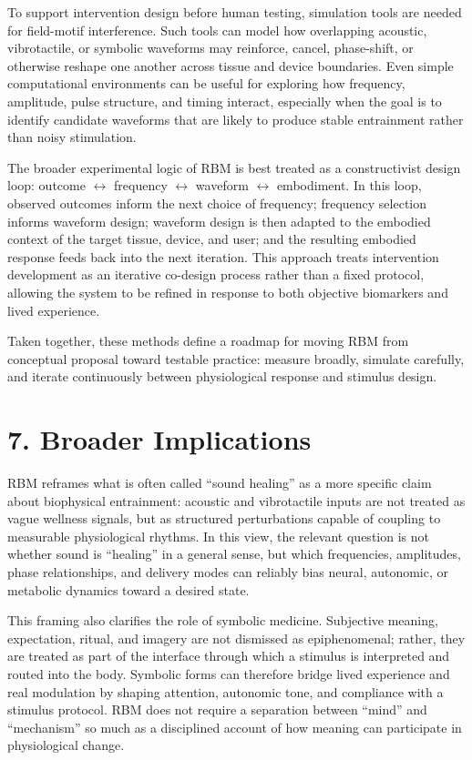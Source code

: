 \documentclass[11pt]{article}
\begin{document}
To support intervention design before human testing, simulation tools are needed for field-motif interference. Such tools can model how overlapping acoustic, vibrotactile, or symbolic waveforms may reinforce, cancel, phase-shift, or otherwise reshape one another across tissue and device boundaries. Even simple computational environments can be useful for exploring how frequency, amplitude, pulse structure, and timing interact, especially when the goal is to identify candidate waveforms that are likely to produce stable entrainment rather than noisy stimulation.

The broader experimental logic of RBM is best treated as a constructivist design loop: outcome $\leftrightarrow$ frequency $\leftrightarrow$ waveform $\leftrightarrow$ embodiment. In this loop, observed outcomes inform the next choice of frequency; frequency selection informs waveform design; waveform design is then adapted to the embodied context of the target tissue, device, and user; and the resulting embodied response feeds back into the next iteration. This approach treats intervention development as an iterative co-design process rather than a fixed protocol, allowing the system to be refined in response to both objective biomarkers and lived experience.

Taken together, these methods define a roadmap for moving RBM from conceptual proposal toward testable practice: measure broadly, simulate carefully, and iterate continuously between physiological response and stimulus design.


\section{7. Broader Implications}

RBM reframes what is often called ``sound healing'' as a more specific claim about biophysical entrainment: acoustic and vibrotactile inputs are not treated as vague wellness signals, but as structured perturbations capable of coupling to measurable physiological rhythms. In this view, the relevant question is not whether sound is ``healing'' in a general sense, but which frequencies, amplitudes, phase relationships, and delivery modes can reliably bias neural, autonomic, or metabolic dynamics toward a desired state.

This framing also clarifies the role of symbolic medicine. Subjective meaning, expectation, ritual, and imagery are not dismissed as epiphenomenal; rather, they are treated as part of the interface through which a stimulus is interpreted and routed into the body. Symbolic forms can therefore bridge lived experience and real modulation by shaping attention, autonomic tone, and compliance with a stimulus protocol. RBM does not require a separation between ``mind'' and ``mechanism'' so much as a disciplined account of how meaning can participate in physiological change.
\end{document}
